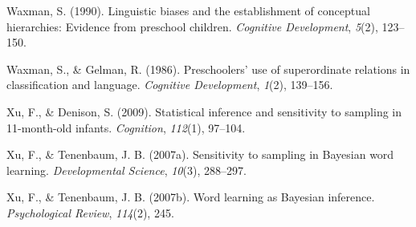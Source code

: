 \documentclass[english,floatsintext,man]{apa6}
\theoremstyle{definition}
\theoremstyle{definition}
\theoremstyle{definition}
\theoremstyle{remark}
\begin{document}
\hypertarget{ref-waxman1990}{}
Waxman, S. (1990). Linguistic biases and the establishment of conceptual
hierarchies: Evidence from preschool children. \emph{Cognitive
Development}, \emph{5}(2), 123--150.

\hypertarget{ref-waxman1986}{}
Waxman, S., \& Gelman, R. (1986). Preschoolers' use of superordinate
relations in classification and language. \emph{Cognitive Development},
\emph{1}(2), 139--156.

\hypertarget{ref-xu2009}{}
Xu, F., \& Denison, S. (2009). Statistical inference and sensitivity to
sampling in 11-month-old infants. \emph{Cognition}, \emph{112}(1),
97--104.

\hypertarget{ref-xu2007b}{}
Xu, F., \& Tenenbaum, J. B. (2007a). Sensitivity to sampling in Bayesian
word learning. \emph{Developmental Science}, \emph{10}(3), 288--297.

\hypertarget{ref-xu2007word}{}
Xu, F., \& Tenenbaum, J. B. (2007b). Word learning as Bayesian
inference. \emph{Psychological Review}, \emph{114}(2), 245.
\end{document}
